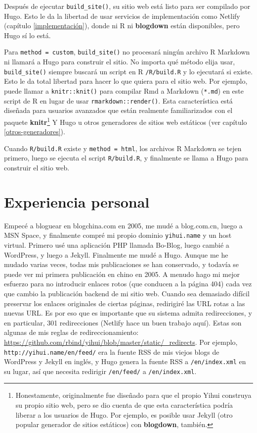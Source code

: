 \documentclass[12pt,]{krantz}
\theoremstyle{definition}
\theoremstyle{definition}
\theoremstyle{definition}
\theoremstyle{remark}
\begin{document}
Después de ejecutar \texttt{build\_site()}, su sitio web está listo para
ser compilado por Hugo. Esto le da la libertad de usar servicios de
implementación como Netlify (capítulo \ref{implementación}), donde ni R
ni \textbf{blogdown} están disponibles, pero Hugo sí lo está.

Para \texttt{method\ =\ \textquotesingle{}custom\textquotesingle{}},
\texttt{build\_site()} no procesará ningún archivo R Markdown ni llamará
a Hugo para construir el sitio. No importa qué método elija usar,
\texttt{build\_site()} siempre buscará un script en R
\texttt{/R/build.R} y lo ejecutará si existe. Esto le da total libertad
para hacer lo que quiera para el sitio web. Por ejemplo, puede llamar a
\texttt{knitr::knit()} para compilar Rmd a Markdown (\texttt{*.md}) en
este script de R en lugar de usar \texttt{rmarkdown::render()}. Esta
característica está diseñada para usuarios avanzados que están realmente
familiarizados con el paquete \textbf{knitr}\footnote{Honestamente,
  originalmente fue diseñado para que el propio Yihui construya su
  propio sitio web, pero se dio cuenta de que esta característica podría
  liberar a los usuarios de Hugo. Por ejemplo, es posible usar Jekyll
  (otro popular generador de sitios estáticos) con \textbf{blogdown},
  también.} Y Hugo u otros generadores de sitios web estáticos (ver
capítulo \ref{otros-generadores}).

Cuando \texttt{R/build.R} existe y
\texttt{method\ =\ \textquotesingle{}html\textquotesingle{}}, los
archivos R Markdown se tejen primero, luego se ejecuta el script
\texttt{R/build.R}, y finalmente se llama a Hugo para construir el sitio
web.

\hypertarget{experiencia-personal}{%
\chapter{Experiencia personal}\label{experiencia-personal}}

Empecé a bloguear en blogchina.com en 2005, me mudé a blog.com.cn, luego
a MSN Space, y finalmente compré mi propio dominio \texttt{yihui.name} y
un host virtual. Primero usé una aplicación PHP llamada Bo-Blog, luego
cambié a WordPress, y luego a Jekyll. Finalmente me mudé a Hugo. Aunque
me he mudado varias veces, todas mis publicaciones se han conservado, y
todavía se puede ver mi primera publicación en chino en 2005. A menudo
hago mi mejor esfuerzo para no introducir enlaces rotos (que conducen a
la página 404) cada vez que cambio la publicación backend de mi sitio
web. Cuando sea demasiado difícil preservar los enlaces originales de
ciertas páginas, redirigiré las URL rotas a las nuevas URL. Es por eso
que es importante que su sistema admita redirecciones, y en particular,
301 redirecciones (Netlify hace un buen trabajo aquí). Estas son algunas
de mis reglas de redireccionamiento:
\url{https://github.com/rbind/yihui/blob/master/static/_redirects}. Por
ejemplo, \texttt{http://yihui.name/en/feed/} era la fuente RSS de mis
viejos blogs de WordPress y Jekyll en inglés, y Hugo genera la fuente
RSS a \texttt{/en/index.xml} en su lugar, así que necesita redirigir
\texttt{/en/feed/} a \texttt{/en/index.xml}.
\end{document}

